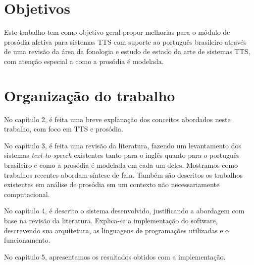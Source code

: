 \section{Objetivos}
Este trabalho tem como objetivo geral propor melhorias para o módulo de prosódia afetiva para sistemas TTS com suporte ao português brasileiro através de uma revisão da área da fonologia e estudo de estado da arte de sistemas TTS, com atenção especial a como a prosódia é modelada.

\section{Organização do trabalho}

No capítulo 2, é feita uma breve explanação dos conceitos abordados neste
trabalho, com foco em TTS e prosódia.


No capítulo 3, é feita uma revisão da literatura, fazendo um levantamento dos
sistemas \emph{text-to-speech} existentes tanto para o inglês quanto para o
português brasileiro e como a prosódia é modelada em cada um deles. Mostramos
como trabalhos recentes abordam síntese de fala. Também são descritos os
trabalhos existentes em análise de prosódia em um contexto não necessariamente
computacional.

No capítulo 4, é descrito o sistema desenvolvido, justificando a abordagem com
base na revisão da literatura. Explica-se a implementação do software,
descrevendo sua arquitetura, as linguagens de programações utilizadas e o funcionamento.

No capítulo 5, apresentamos os resultados obtidos com a implementação.